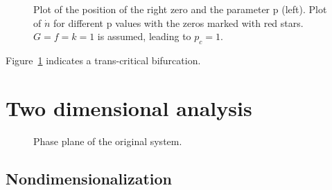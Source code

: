 \begin{figure}

\caption{Plot of the position of the right zero and the parameter p (left). Plot of $\dot{n}$ for different p values with the zeros marked with red stars. $G=f=k=1$ is assumed, leading to $p_c = 1$.}
\label{fig:transBif}
\end{figure}
Figure~\ref{fig:transBif} indicates a trans-critical bifurcation.

\section{Two dimensional analysis}
\begin{figure}


\caption{Phase plane of the original system.}
\end{figure}
\subsection{Nondimensionalization}



